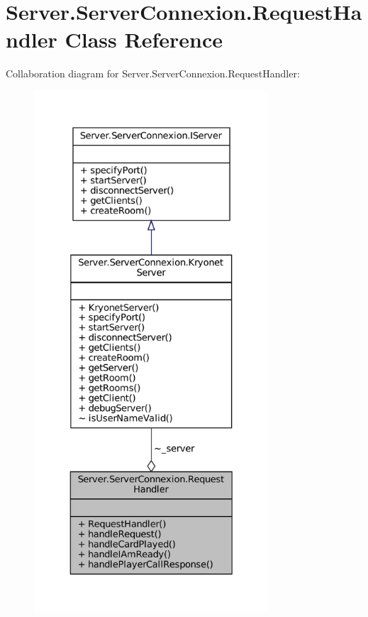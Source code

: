 \hypertarget{classServer_1_1ServerConnexion_1_1RequestHandler}{}\section{Server.\+Server\+Connexion.\+Request\+Handler Class Reference}
\label{classServer_1_1ServerConnexion_1_1RequestHandler}


Collaboration diagram for Server.\+Server\+Connexion.\+Request\+Handler\+:
\nopagebreak
\begin{figure}[H]
\begin{center}
\leavevmode
\includegraphics[height=550pt]{classServer_1_1ServerConnexion_1_1RequestHandler__coll__graph}
\end{center}
\end{figure}
